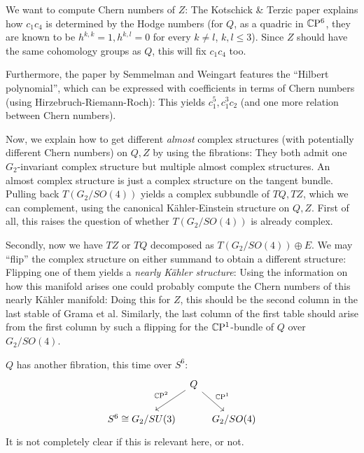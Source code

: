 \documentclass{scrartcl}
\begin{document}
\medskip

We want to compute Chern numbers of $Z$: The Kotschick \& Terzic paper explains how $c_1c_4$ is determined by the Hodge numbers (for $Q$, as a quadric in $\mathbb{C}\mathrm{P}^6$, they are known to be $h^{k,k}=1,h^{k,l}=0$ for every $k\neq l$, $k,l\leq 3$). Since $Z$ should have the same cohomology groups as $Q$, this will fix $c_1c_4$ too.

\medskip

Furthermore, the paper by Semmelman and Weingart features the ``Hilbert polynomial'', which can be expressed with coefficients in terms of Chern numbers (using Hirzebruch-Riemann-Roch): This yields $c_1^5,c_1^3c_2$ (and one more relation between Chern numbers).

\medskip

Now, we explain how to get different \emph{almost} complex structures (with potentially different Chern numbers) on $Q,Z$ by using the fibrations: They both admit one $G_2$-invariant complex structure
but multiple almost complex structures. An almost complex structure is just a complex structure on the tangent bundle. Pulling back $T(G_2/SO(4))$ yields a complex subbundle of $TQ,TZ$, which we can complement, using the canonical K\"{a}hler-Einstein structure on $Q,Z$.
First of all, this raises the question of whether $T(G_2/SO(4))$ is already complex.

\medskip

Secondly, now we have $TZ$ or $TQ$ decomposed as $T(G_2/SO(4))\oplus E$. We may ``flip'' the complex structure on either summand to obtain a different structure: Flipping one of them yields a \emph{nearly K\"{a}hler structure}: Using the information on how this manifold arises one could probably compute the Chern numbers of this nearly K\"{a}hler manifold: Doing this for $Z$, this should be the second column in the last stable of Grama et al. Similarly, the last column of the first table should arise from the first column by such a flipping for the $\mathbb{C}\mathrm{P}^1$-bundle of $Q$ over $G_2/SO(4)$.

\medskip

$Q$ has another fibration, this time over $S^6$:
\begin{equation*}
	\begin{tikzcd}[column sep=tiny]
		& Q \ar[dr,"\CP^1"] \ar[dl,"\CP^2"'] \\ 
		S^6\cong G_2/SU(3) &[-10pt] & G_2/SO(4)
	\end{tikzcd}
\end{equation*} 
It is not completely clear if this is relevant here, or not. 
\end{document}
